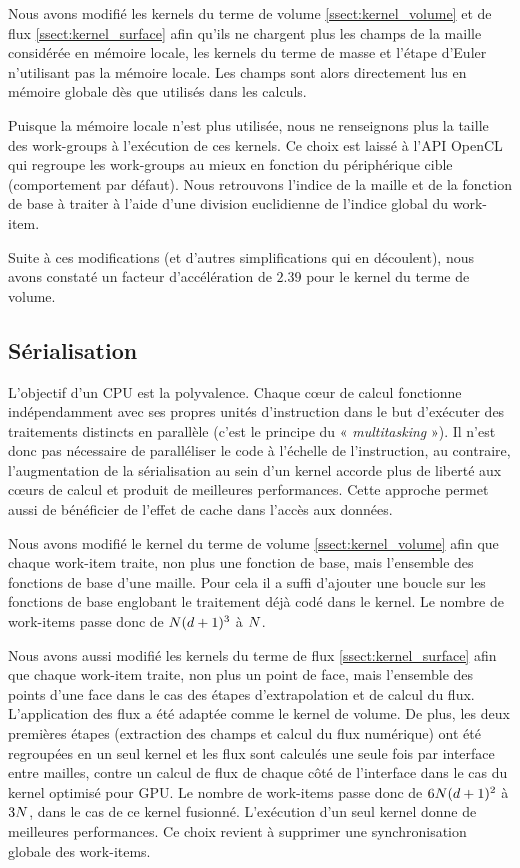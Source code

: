 Nous avons modifié les kernels du terme de volume \ref{ssect:kernel_volume}
et de flux \ref{ssect:kernel_surface} afin qu'ils ne chargent plus
les champs de la maille considérée en mémoire locale,
les kernels du terme de masse et l'étape d'Euler n'utilisant pas
la mémoire locale.
Les champs sont alors directement lus en mémoire globale dès
que utilisés dans les calculs.

Puisque la mémoire locale n'est plus utilisée, nous ne renseignons plus
la taille des work-groups à l'exécution de ces kernels.
Ce choix est laissé à l'API OpenCL qui regroupe
les work-groups au mieux en fonction du périphérique cible (comportement par défaut).
Nous retrouvons l'indice de la maille et de la fonction de base à traiter
à l'aide d'une division euclidienne de l'indice global du work-item.

Suite à ces modifications (et d'autres simplifications qui en découlent),
nous avons constaté un facteur d'accélération de $2.39$ pour le kernel
du terme de volume.
\\


\subsection{Sérialisation}
\label{ssect:cpu_serialisation}


L'objectif d'un CPU est la polyvalence. Chaque cœur de calcul fonctionne indépendamment avec ses propres unités d'instruction dans le but
d'exécuter des traitements distincts en parallèle
(c'est le principe du « \textit{multitasking} »).
Il n'est donc pas nécessaire de paralléliser le code à l'échelle de
l'instruction, au contraire, l'augmentation de la sérialisation au sein
d'un kernel accorde plus de liberté aux cœurs de calcul et produit de
meilleures performances.
Cette approche permet aussi de bénéficier de l'effet de cache dans
l'accès aux données.

Nous avons modifié le kernel du terme de volume \ref{ssect:kernel_volume}
afin que chaque work-item traite,
non plus une fonction de base, mais l'ensemble des fonctions de base
d'une maille.
Pour cela il a suffi d'ajouter une boucle sur
les fonctions de base englobant le traitement déjà codé dans
le kernel.
Le nombre de work-items passe donc de $N (d + 1)^3$
à $N$.


Nous avons aussi modifié les kernels du terme 
de flux \ref{ssect:kernel_surface} afin que chaque work-item traite,
non plus un point de face, mais l'ensemble des points 
d'une face dans le cas des étapes d'extrapolation et de calcul du flux.
L'application des flux a été adaptée comme le kernel de volume.
De plus, les deux premières étapes (extraction des champs
et calcul du flux numérique) ont été regroupées en un seul kernel et
les flux sont calculés une seule fois par interface entre mailles,
contre un calcul de flux de chaque côté de l'interface dans le cas
du kernel optimisé pour GPU.
Le nombre de work-items passe donc de 
$6 N (d + 1)^2$ à $3 N$,
dans le cas de ce kernel fusionné.
L'exécution d'un seul kernel donne de meilleures performances.
Ce choix revient à supprimer une synchronisation globale des work-items.


